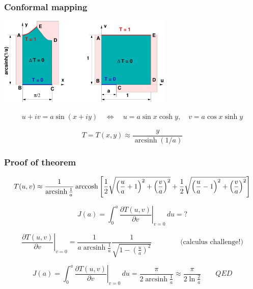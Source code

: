 \documentclass[10pt]{beamer}
\newcommand{\arcsinh}{\mathop\mathrm{arcsinh}\nolimits}
\newcommand{\arccosh}{\mathop\mathrm{arccosh}\nolimits}
\begin{document}
\begin{frame}
  \frametitle{Conformal mapping}

\begin{center}
  \includegraphics[height=42mm]{pde2.pdf}
\end{center}

\begin{gather*}
  u + iv = a \sin(x + iy) 
  \quad \Leftrightarrow \quad
  u = a \sin x \cosh y,  \quad v = a \cos x \sinh y
\end{gather*}

\pause 

\[
  T = T(x,y) \approx \frac{y}{\arcsinh(1/a)}
\]

\end{frame}

\begin{frame}[t]
  \frametitle{Proof of theorem}

\small
\[
  T(u,v) \approx  
  \frac{1}{\arcsinh\frac1a} \arccosh \left[ \frac{1}{2} 
    \sqrt{\Bigl(\frac{u}{a}+1\Bigr)^2 + \Bigl(\frac{v}{a}\Bigr)^2}
    + \frac{1}{2} \sqrt{\Bigl(\frac{u}{a}-1\Bigr)^2 +
    \Bigl(\frac{v}{a}\Bigr)^2} \right]
\]
\normalsize

\bigskip
\pause

\[
  J(a) = \int_0^a \left. \frac{\partial T(u,v)}{\partial v} \right|_{v=0}
    \,du = ?
\]  

\pause

\[
  \left.\frac{\partial T(u,v)}{\partial v}\right|_{v=0} = 
    \frac{1}{a\arcsinh\frac1a} \frac{1}{\sqrt{1-(\frac{u}{a})^2}}
    \qquad\qquad \text{(calculus challenge!)}
\]

\bigskip
\pause

\[
  J(a) = \int_0^a \left. \frac{\partial T(u,v)}{\partial v} \right|_{v=0}
    \,du
    =
    \frac{\pi}{2\arcsinh\frac1a}
    \approx
    \frac{\pi}{2\ln \frac2a} \qquad QED
\]

\end{frame}
\end{document}
